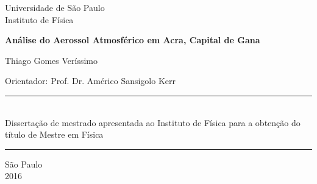 \begin{titlepage}
\setlength{\voffset}{0pt}
\setlength{\hoffset}{0pt}
\centering
\Large{Universidade de São Paulo \\
Instituto de Física}


\LARGE{\bf Análise do Aerossol Atmosférico em Acra, Capital de Gana
}


\Large{ Thiago Gomes Veríssimo
}


\begin{flushright}

\begin{minipage}{.6\textwidth}
\large{Orientador: Prof. Dr. Américo Sansigolo Kerr
}
\end{minipage}


\begin{minipage}{.6\textwidth}
\rule{\linewidth}{0.5mm}\\
\large{
Dissertação de mestrado apresentada ao Instituto de Física para a obtenção do 
título de Mestre em Física
}

\rule{\linewidth}{0.5mm}
\end{minipage}
\end{flushright}


\begin{flushleft}

\normalsize

\hspace{.03\textwidth}


\end{flushleft}


São Paulo\\
2016

\end{titlepage}

